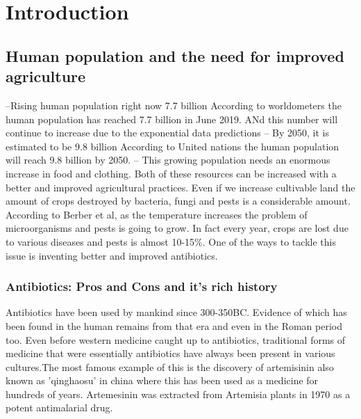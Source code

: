 \chapter{Introduction}
\label{chap:introduction}
\section{Human population and the need for improved agriculture}
--Rising human population right now 7.7 billion 
According to worldometers the human population has reached 7.7 billion in June 2019. ANd this number will continue to increase due to the exponential data predictions
-- By 2050, it is estimated to be 9.8 billion 
According to United nations the human population will reach 9.8 billion by 2050.
-- This growing population needs an enormous increase in food and clothing.
Both of these resources can be increased with a
better and improved agricultural practices. 
Even if we increase cultivable land the amount of crops destroyed by bacteria, fungi and
pests is a considerable amount. According to Berber et al, as the temperature increases the problem of microorganisms and pests is going to grow.\cite{Gurr2013} 
In fact every year, crops are lost due to various diseases and pests is almost 10-15\%.
One of the ways to tackle this issue is inventing better and improved antibiotics. 

\subsection{Antibiotics: Pros and Cons and it's rich history}
Antibiotics have been used by mankind since 300-350BC. Evidence of which has been found in the 
human remains from that era and even in the Roman period too. \cite{Armelagos2010, 
Villanueva1980, Anderson1989} 
Even before western medicine caught up to antibiotics, traditional forms 
of medicine that were essentially antibiotics have always been present 
in various cultures.\cite{Aminov2010}The most famous example of this is 
the discovery of  artemisinin also known as 'qinghaosu' in china where 
this has been used as a medicine for hundreds of years. Artemesinin was 
extracted from  Artemisia plants in 1970 as a potent antimalarial 
drug.\cite{Su2009}

